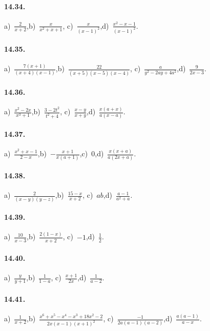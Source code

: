 \paragraph{14.34.}
a)~$\frac{2}{x+2}$,\quad b)~$\frac{x}{x^{2}+x+1}$, \quad c)~$\frac{x}{(x-1)^{2}}$,\quad d)~$\frac{x^{2}-x-1}{(x-1)^{2}}$.

\paragraph{14.35.}
a)~$\frac{7(x+1)}{(x+4)(x-1)}$,\quad b)~$\frac{22}{(x+5)(x-5)(x-4)}$, \quad c)~$\frac{a}{y^{2}-2ay+4a^{2}}$,\quad d)~$\frac{9}{2x-3}$.

\paragraph{14.36.}
a)~$\frac{x^{2}-2x}{x^{3}+1}$,\quad b)~$\frac{3-2t^{2}}{t^{2}+4}$, \quad c)~$\frac{x-y}{x+y}$,\quad d)~$\frac{x(a+x)}{a(x-a)}$.

\paragraph{14.37.}
a)~$\frac{x^{2}+x-1}{2-x}$,\quad b)~$-\frac{x+1}{x(a+1)}$,\quad c)~$0$,\quad d)~$\frac{x(x+a)}{a(2x+a)}$.

\paragraph{14.38.}
a)~$\frac{2}{(x-y)(y-z)}$,\quad b)~$\frac{15-x}{x+2}$, \quad c)~$ab$,\quad d)~$\frac{a-1}{a^{2}+a}$.

\paragraph{14.39.}
a)~$\frac{10}{x-3}$,\quad b)~$\frac{2(1-x)}{x+2}$, \quad c)~$-1$,\quad d)~$\frac{1}{2}$.

\paragraph{14.40.}
a)~$\frac{y}{y+1}$,\quad b)~$\frac{1}{1-a}$, \quad c)~$\frac{x+1}{2x}$,\quad d)~$\frac{1}{a-2}$.

\paragraph{14.41.}
a)~$\frac{1}{x+2}$,\quad b)~$\frac{x^{6}+x^{5}-x^{4}-x^{3}+18x^{2}-2}{2x(x-1)(x+1)^{2}}$, \quad c)~$\frac{-1}{2a(a-1)(a-2)}$,\quad d)~$\frac{a(a-1)}{a-x}$.

